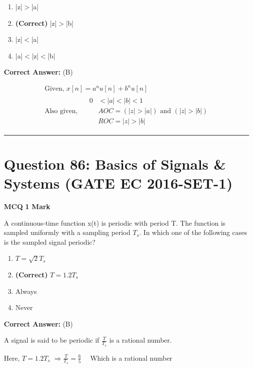 \documentclass[11pt,a4paper]{article}
\begin{document}
\begin{enumerate}[label=(\Alph*)]
    \item |z|$>$|a|
    \item \textbf{(Correct)} |z|$>$|b|
    \item |z|$<$|a|
    \item |a|$<$|z|$<$|b|
\end{enumerate}

\noindent \textbf{Correct Answer:} (B)

\begin{tcolorbox}[solbox, title=Detailed Solution -- Question 85]
\[
\begin{array}{l} \text { Given, } x[n]=a^{n} u[n]+b^{n} u[n] \\ \text { Also given, } \quad \begin{aligned} 0 &<|a|<|b|<1 \\ & A O C=(|z|>|a|) \text { and }(|z|>|b|) \\ & R O C=|z|>|b| \end{aligned} \end{array}
\]
\end{tcolorbox}

\vspace{1.5em}
\hrule
\vspace{1.5em}

\section*{Question 86: Basics of Signals \& Systems (GATE EC 2016-SET-1)}
\noindent \textbf{\color{primary}MCQ} \hfill \textbf{\color{secondary}1 Mark}


\noindent A continuous-time function x(t) is periodic with period T. The function is sampled uniformly with a sampling period $T_{s}$. In which one of the following cases is the sampled signal periodic?


\begin{enumerate}[label=(\Alph*)]
    \item $T=\sqrt{2}T_{s}$
    \item \textbf{(Correct)} $T=1.2T_{s}$
    \item Always
    \item Never
\end{enumerate}

\noindent \textbf{Correct Answer:} (B)

\begin{tcolorbox}[solbox, title=Detailed Solution -- Question 86]
A signal is said to be periodic if  $\frac{T}{T_{s}}$  is a rational
number.

Here, $T=1.2 T_{s}$
$\Rightarrow \frac{T}{T_{s}}=\frac{6}{5} \quad$ Which is a rational number
\end{tcolorbox}
\end{document}
